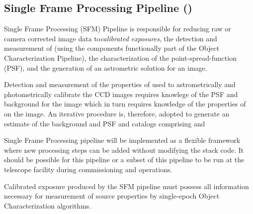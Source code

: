 \subsection{Single Frame Processing Pipeline (\wbsSFM)}
\label{sec:apSingleFrameProcessing}

Single Frame Processing (SFM) Pipeline is responsible for reducing raw or camera corrected image data to\emph{calibrated exposures}, the detection and measurement of \Sources (using the components functionally  part of the Object Characterization Pipeline), the characterization of the point-spread-function (PSF), and the generation of an astrometric solution for an image.

Detection and measurement of the properties of \Sources used to astrometrically and photometrically calibrate the CCD images requires knowlege of the PSF and background for the image which in turn requires knowledge of the properties of \Sources on the image. An iterative procedure is, therefore, adopted to generate an estimate of the background and PSF and \Source catalogs comprising \hyperref[sec:apPSFBackground]{}  and \hyperref[sec:apSourcemeasurement]{}

Single Frame Processing pipeline will be implemented as a flexible framework where new processing steps can be added without modifying the stack code. It should be possible for this pipeline or a subset of this pipeline to be run at the telescope facility during commissioning and operations.  


Calibrated exposure produced by the SFM pipeline must possess all information necessary for measurement of source properties by single-epoch Object Characterization algorithms.

